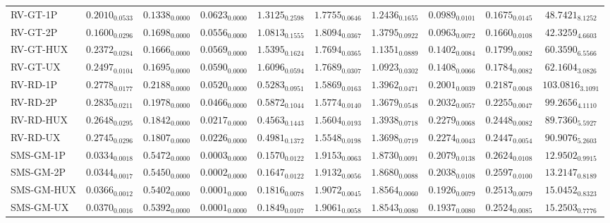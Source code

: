 \begin{longtable}{@{}lccccccccc@{}}
RV-GT-1P & $0.2010_{0.0533}$ & $0.1338_{0.0000}$ & $0.0623_{0.0000}$ & $1.3125_{0.2598}$ & $1.7755_{0.0646}$ & $1.2436_{0.1655}$ & $0.0989_{0.0101}$ & $0.1675_{0.0145}$ & $48.7421_{8.1252}$ \\
RV-GT-2P & $0.1600_{0.0296}$ & $0.1698_{0.0000}$ & $0.0556_{0.0000}$ & $1.0813_{0.1555}$ & $1.8094_{0.0367}$ & $1.3795_{0.0922}$ & $0.0963_{0.0072}$ & $0.1660_{0.0108}$ & $42.3259_{4.6603}$ \\
RV-GT-HUX & $0.2372_{0.0284}$ & $0.1666_{0.0000}$ & $0.0569_{0.0000}$ & $1.5395_{0.1624}$ & $1.7694_{0.0365}$ & $1.1351_{0.0889}$ & $0.1402_{0.0084}$ & $0.1799_{0.0082}$ & $60.3590_{6.5566}$ \\
RV-GT-UX & $0.2497_{0.0104}$ & $0.1695_{0.0000}$ & $0.0590_{0.0000}$ & $1.6096_{0.0594}$ & $1.7689_{0.0307}$ & $1.0923_{0.0302}$ & $0.1408_{0.0066}$ & $0.1784_{0.0082}$ & $62.1604_{3.0826}$ \\
RV-RD-1P & $0.2778_{0.0177}$ & $0.2188_{0.0000}$ & $0.0520_{0.0000}$ & $0.5283_{0.0951}$ & $1.5869_{0.0163}$ & $1.3962_{0.0471}$ & $0.2001_{0.0039}$ & $0.2187_{0.0048}$ & $103.0816_{3.1091}$ \\
RV-RD-2P & $0.2835_{0.0211}$ & $0.1978_{0.0000}$ & $0.0466_{0.0000}$ & $0.5872_{0.1044}$ & $1.5774_{0.0140}$ & $1.3679_{0.0548}$ & $0.2032_{0.0057}$ & $0.2255_{0.0047}$ & $99.2656_{4.1110}$ \\
RV-RD-HUX & $0.2648_{0.0295}$ & $0.1842_{0.0000}$ & $0.0217_{0.0000}$ & $0.4563_{0.1443}$ & $1.5604_{0.0193}$ & $1.3938_{0.0718}$ & $0.2279_{0.0068}$ & $0.2448_{0.0082}$ & $89.7360_{5.5927}$ \\
RV-RD-UX & $0.2745_{0.0296}$ & $0.1807_{0.0000}$ & $0.0226_{0.0000}$ & $0.4981_{0.1372}$ & $1.5548_{0.0198}$ & $1.3698_{0.0719}$ & $0.2274_{0.0043}$ & $0.2447_{0.0054}$ & $90.9076_{5.2603}$ \\
SMS-GM-1P & $0.0334_{0.0018}$ & $0.5472_{0.0000}$ & $0.0003_{0.0000}$ & $0.1570_{0.0122}$ & $1.9153_{0.0063}$ & $1.8730_{0.0091}$ & $0.2079_{0.0138}$ & $0.2624_{0.0108}$ & $12.9502_{0.9915}$ \\
SMS-GM-2P & $0.0344_{0.0017}$ & $0.5450_{0.0000}$ & $\mathbf{0.0002}_{0.0000}$ & $0.1647_{0.0122}$ & $1.9132_{0.0056}$ & $1.8680_{0.0088}$ & $0.2038_{0.0108}$ & $0.2597_{0.0100}$ & $13.2147_{0.8189}$ \\
SMS-GM-HUX & $0.0366_{0.0012}$ & $0.5402_{0.0000}$ & $\mathbf{0.0001}_{0.0000}$ & $0.1816_{0.0078}$ & $1.9072_{0.0045}$ & $1.8564_{0.0060}$ & $0.1926_{0.0079}$ & $0.2513_{0.0079}$ & $15.0452_{0.8323}$ \\
SMS-GM-UX & $0.0370_{0.0016}$ & $0.5392_{0.0000}$ & $\mathbf{0.0001}_{0.0000}$ & $0.1849_{0.0107}$ & $1.9061_{0.0058}$ & $1.8543_{0.0080}$ & $0.1937_{0.0080}$ & $0.2524_{0.0085}$ & $15.2503_{0.7776}$ \\

\end{longtable}
